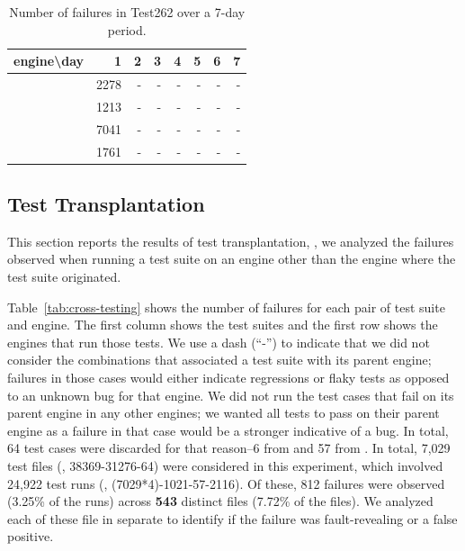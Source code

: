 \documentclass[10pt,conference,anonymous]{IEEEtran}
\begin{document}
\begin{table}[h]
  \centering
  \caption{\label{tab:test262}Number of failures in Test262 over
    a 7-day period.}
  \begin{tabular}{crrrrrrr}
    \toprule
    engine\textbackslash{}day& 1 & 2 & 3 & 4 & 5 & 6 & 7 \\
    \midrule
    \jsc{} & 2278 & - & - & - & - & - & - \\
    \veight{} & 1213 & - & - & - & - & - & - \\
    \chakra{} & 7041 & - & - & - & - & - & - \\
    \smonkey{} & 1761 & - & - & - & - & - & - \\
    \bottomrule 
  \end{tabular}
\end{table}



\subsection{Test Transplantation}
\label{sec:transplantation}


This section reports the results of test transplantation, \ie{}, we
analyzed the failures observed when running a test suite on an engine
other than the engine where the test suite
originated.

Table~\ref{tab:cross-testing} shows the number of failures for each
pair of test suite and engine. The first column shows the test suites
and the first row shows the engines that run those tests. We use a
dash (``-'') to indicate that we did not consider the combinations
that associated a test suite with its parent engine; failures in those
cases would either indicate regressions or flaky tests as opposed to
an unknown bug for that engine. We did not run the test cases that
fail on its parent engine in any other engines; we wanted all tests to
pass on their parent engine as a failure in that case would be a
stronger indicative of a bug. In total, 64 test cases were discarded
for that reason--6 from \jsc{} and 57 from \smonkey. In total, 7,029
test files (\ie{}, 38369-31276-64) were considered in this experiment,
which involved 24,922 test runs (\ie, (7029*4)-1021-57-2116).  Of
these, 812 failures were observed (3.25\% of the runs) across
\textbf{543} distinct files (7.72\% of the files). We analyzed each of
these file in separate to identify if the failure was fault-revealing
or a false positive.
\end{document}
